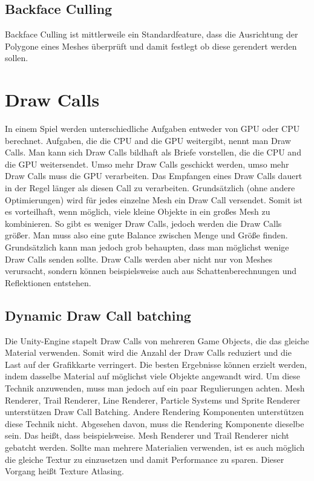 \subsection{Backface Culling}
Backface Culling ist mittlerweile ein Standardfeature, dass die Ausrichtung der Polygone eines Meshes überprüft und damit festlegt ob diese gerendert werden sollen.
\cite{_cryengine_culling}

\section{Draw Calls}
In einem Spiel werden unterschiedliche Aufgaben entweder von GPU oder CPU berechnet.
Aufgaben, die die CPU and die GPU weitergibt, nennt man Draw Calls. Man kann sich Draw Calls bildhaft als Briefe vorstellen, die die CPU and die GPU weitersendet. Umso mehr Draw Calls geschickt werden, umso mehr Draw Calls muss die GPU verarbeiten. Das Empfangen eines Draw Calls dauert in der Regel länger als diesen Call zu verarbeiten. Grundsätzlich (ohne andere Optimierungen) wird für jedes einzelne Mesh ein Draw Call versendet. Somit ist es vorteilhaft, wenn möglich, viele kleine Objekte in ein großes Mesh zu kombinieren. So gibt es weniger Draw Calls, jedoch werden die Draw Calls größer. Man muss also eine gute Balance zwischen Menge und Größe finden. Grundsätzlich kann man jedoch grob behaupten, dass man möglichst wenige Draw Calls senden sollte. Draw Calls werden aber nicht nur von Meshes verursacht, sondern können beispielsweise auch aus Schattenberechnungen und Reflektionen entstehen.

\subsection{Dynamic Draw Call batching}
Die Unity-Engine stapelt Draw Calls von mehreren Game Objects, die das gleiche Material verwenden. Somit wird die Anzahl der Draw Calls reduziert und die Last auf der Grafikkarte verringert. Die besten Ergebnisse können erzielt werden, indem dasselbe Material auf möglichst viele Objekte angewandt wird. Um diese Technik anzuwenden, muss man jedoch auf ein paar Regulierungen achten. Mesh Renderer, Trail Renderer, Line Renderer, Particle Systems und Sprite Renderer unterstützen Draw Call Batching. Andere Rendering Komponenten unterstützen diese Technik nicht. Abgesehen davon, muss die Rendering Komponente dieselbe sein. Das heißt, dass beispielsweise. Mesh Renderer und Trail Renderer nicht gebatcht werden. Sollte man mehrere Materialien verwenden, ist es auch möglich die gleiche Textur zu einzusetzen und damit Performance zu sparen. Dieser Vorgang heißt Texture Atlasing.

